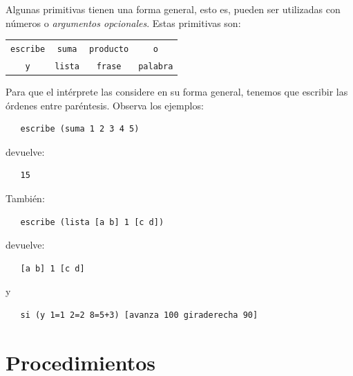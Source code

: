 Algunas primitivas tienen una forma general, esto es, pueden ser utilizadas
con n\'umeros o \textit{argumentos opcionales}. 
Estas primitivas son:
\begin{center} \begin{tabular}{*{4}{c}}
   \texttt{escribe} & \texttt{suma} & \texttt{producto} & \texttt{o} \\
   \texttt{y} & \texttt{lista} & \texttt{frase} & \texttt{palabra} 
\end{tabular} \end{center}
Para que el int\'erprete las considere en su forma general, tenemos que
escribir las \'ordenes entre par\'entesis. Observa los ejemplos:
\begin{verbatim}
   escribe (suma 1 2 3 4 5) \end{verbatim} devuelve:
\begin{verbatim}
   15  \end{verbatim}
Tambi\'en:
\begin{verbatim}
   escribe (lista [a b] 1 [c d]) \end{verbatim} devuelve:
\begin{verbatim}
   [a b] 1 [c d] \end{verbatim}
y
\begin{verbatim}
   si (y 1=1 2=2 8=5+3) [avanza 100 giraderecha 90] \end{verbatim}

\section{Procedimientos}
   \label{Procedimientos}

